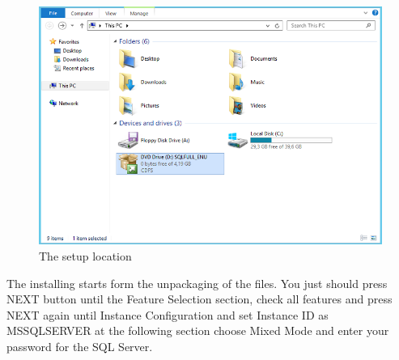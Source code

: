 \documentclass[english]{article}
\begin{document}
\newpage
\begin{figure}[hb]
\centerline{\includegraphics[scale=0.45]{SQL/setupLocation}}
\caption{The setup location}
\label{fig:setupLocation}
\end{figure}

The installing starts form the unpackaging of the files. You just should press NEXT button until the Feature Selection section, check all features and press NEXT again until Instance Configuration and set Instance ID as MSSQLSERVER at the following section choose Mixed Mode and enter your password for the SQL Server.
\end{document}
